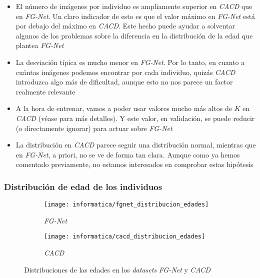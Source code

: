 \begin{itemize}
    \item El número de imágenes por individuo es ampliamente superior en \textit{CACD} que en \textit{FG-Net}. Un claro indicador de esto es que el valor máximo en \textit{FG-Net} está por debajo del máximo en \textit{CACD}. Este hecho puede ayudar a solventar algunos de los problemas sobre la diferencia en la distribución de la edad que plantea \textit{FG-Net}
    \item La desviación típica es mucho menor en \textit{FG-Net}. Por lo tanto, en cuanto a cuántas imágenes podemos encontrar por cada individuo, quizás \textit{CACD} introduzca algo más de dificultad, aunque esto no nos parece un factor realmente relevante
    \item A la hora de entrenar, vamos a poder usar valores mucho más altos de $K$ en \textit{CACD} (véase  para más detalles). Y este valor, en validación, se puede reducir (o directamente ignorar) para actuar sobre \textit{FG-Net}
    \item La distribución en \textit{CACD} parece seguir una distribución normal, mientras que en \textit{FG-Net}, a priori, no se ve de forma tan clara. Aunque como ya hemos comentado previamente, no estamos interesados en comprobar estas hipótesis
\end{itemize}

\subsubsection{Distribución de edad de los individuos} \label{isubsubs:conjunta_fgnet_cacd_edades}

\begin{figure}[H]
\centering
    \begin{subfigure}{.5\textwidth}
        \centering
        \texttt{[image: informatica/fgnet\_distribucion\_edades]}
        \caption{\textit{FG-Net}}
    \end{subfigure}%
    \begin{subfigure}{.5\textwidth}
        \centering
        \texttt{[image: informatica/cacd\_distribucion\_edades]}
        \caption{\textit{CACD}}
    \end{subfigure}
    \caption{Distribuciones de las edades en los \textit{datasets} \textit{FG-Net} y \textit{CACD}}
    \label{img:conjunta_fgnet_cacd_edades}
\end{figure}

